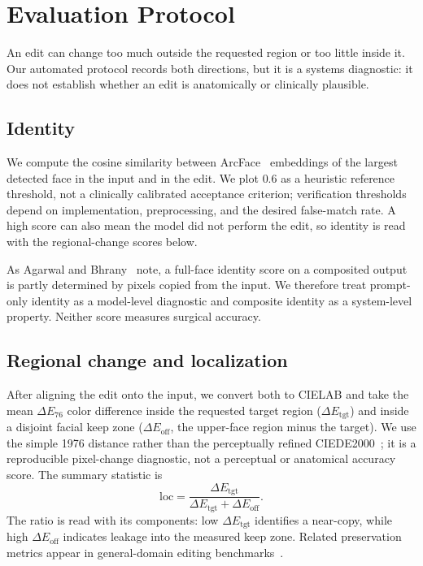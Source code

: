 \section{Evaluation Protocol}
\label{sec:protocol}

An edit can change too much outside the requested region or too little inside it.
Our automated protocol records both directions, but it is a systems diagnostic:
it does not establish whether an edit is anatomically or clinically plausible.

\subsection{Identity}

We compute the cosine similarity between ArcFace~\cite{deng2019arcface}
embeddings of the largest detected face in the input and in the edit. We plot
$0.6$ as a heuristic reference threshold, not a clinically calibrated acceptance
criterion; verification thresholds depend on implementation, preprocessing, and
the desired false-match rate. A high score can also mean the model did not perform
the edit, so identity is read with the regional-change scores below.

As Agarwal and Bhrany~\cite{agarwal2026envisage} note, a full-face identity score
on a composited output is partly determined by pixels copied from the input. We
therefore treat prompt-only identity as a model-level diagnostic and composite
identity as a system-level property. Neither score measures surgical accuracy.

\subsection{Regional change and localization}

After aligning the edit onto the input, we convert both to CIELAB and take the
mean $\Delta E_{76}$ color difference inside the requested target region
($\Delta E_{\mathrm{tgt}}$) and inside a disjoint facial keep zone
($\Delta E_{\mathrm{off}}$, the upper-face region minus the target). We use the
simple 1976 distance rather than the perceptually refined
CIEDE2000~\cite{sharma2005ciede2000}; it is a reproducible pixel-change
diagnostic, not a perceptual or anatomical accuracy score. The summary statistic
is
\[
  \mathrm{loc} = \frac{\Delta E_{\mathrm{tgt}}}
                      {\Delta E_{\mathrm{tgt}} + \Delta E_{\mathrm{off}}}.
\]
The ratio is read with its components: low $\Delta E_{\mathrm{tgt}}$ identifies
a near-copy, while high $\Delta E_{\mathrm{off}}$ indicates leakage into the
measured keep zone. Related preservation metrics appear in general-domain editing
benchmarks~\cite{qian2025giebench,alebench2024,sheynin2024emuedit}.


